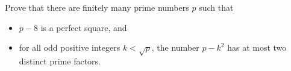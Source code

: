 Prove that there are finitely many prime numbers $p$ such that
\begin{itemize}
\item $p-8$ is a perfect square, and
\item for all odd positive integers $k<\sqrt{p}$, the number $p-k^2$ has at most two distinct prime factors.
\end{itemize}
